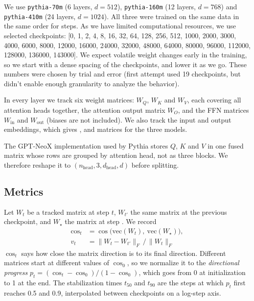 \documentclass[11pt]{article}
\newcommand{\Wq}{W_Q}
\newcommand{\Wk}{W_K}
\newcommand{\Wv}{W_V}
\newcommand{\Wo}{W_O}
\newcommand{\Win}{W_{\mathrm{in}}}
\newcommand{\Wout}{W_{\mathrm{out}}}
\newcommand{\tf}{t_{50}}
\newcommand{\tn}{t_{90}}
\begin{document}
We use \texttt{pythia-70m} (6 layers, $d=512$), \texttt{pythia-160m}
(12 layers, $d=768$) and \texttt{pythia-410m} (24 layers, $d=1024$). All three
were trained on the same data in the same order for \FinalStep{} steps. As we have limited computational resources, we use
selected \NCheckpoints{} checkpoints:
[0, 1, 2, 4, 8, 16, 32, 64, 128, 256, 512, 1000, 2000, 3000, 4000, 6000, 8000, 12000, 16000, 24000, 32000, 48000, 64000, 80000, 96000, 112000, 128000, 136000, 143000]. We expect volatile weight changes early in the training, so we start with a dense spacing of the checkpoints, and lower it as we go. These numbers were chosen by trial and error (first attempt used 19 checkpoints, but didn't enable enough granularity to analyze the behavior).

In every layer we track six weight matrices: $\Wq$, $\Wk$ and $\Wv$, each
covering all attention heads together, the attention output matrix $\Wo$, and
the FFN matrices $\Win$ and $\Wout$ (biases are not included). We also track
the input and output embeddings, which gives \NMatSmall{}, \NMatBig{} and
\NMatHuge{} matrices for the three models.

The GPT-NeoX \citep{black2022gptneox} implementation used by Pythia stores
$Q$, $K$ and $V$ in one fused matrix
whose rows are grouped by attention head, not as three blocks. We therefore
reshape it to $(n_\text{head}, 3, d_\text{head}, d)$ before splitting.

\subsection{Metrics}
\label{sec:metrics}

Let $W_t$ be a tracked matrix at step $t$, $W_{t'}$ the same matrix at the
previous checkpoint, and $W_\star$ the matrix at step \FinalStep{}. We record
\begin{align}
  \cos_t &= \cos\!\big(\mathrm{vec}(W_t),\ \mathrm{vec}(W_\star)\big), \\
  v_t    &= \|W_t - W_{t'}\|_F \,/\, \|W_t\|_F
\end{align}
$\cos_t$ says how close the matrix direction is to its final direction.
Different matrices start at different values of $\cos_0$, so we normalize it to
the \emph{directional progress} $p_t = (\cos_t - \cos_0)/(1 - \cos_0)$, which
goes from 0 at initialization to 1 at the end. The stabilization times $\tf$
and $\tn$ are the steps at which $p_t$ first reaches 0.5 and 0.9, interpolated
between checkpoints on a log-step axis.
\end{document}
